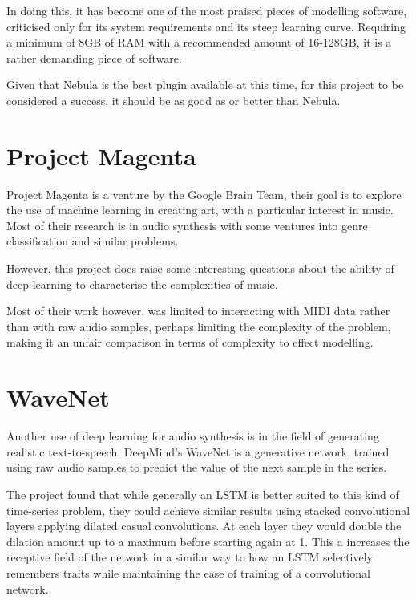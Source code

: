 \documentclass{l4proj}
\begin{document}
In doing this, it has become one of the most praised pieces of modelling
software, criticised only for its system requirements and its steep
learning curve. Requiring a minimum of 8GB of RAM with a recommended
amount of 16-128GB, it is a rather demanding piece of software.

Given that Nebula is the best plugin available at this time, for this
project to be considered a success, it should be as good as or better
than Nebula.

\hypertarget{project-magenta}{%
\section{Project Magenta}\label{project-magenta}}

Project Magenta is a venture by the Google Brain Team, their goal is to
explore the use of machine learning in creating art, with a particular
interest in music. Most of their research is in audio synthesis with
some ventures into genre classification and similar problems.

However, this project does raise some interesting questions about the
ability of deep learning to characterise the complexities of music.

Most of their work however, was limited to interacting with MIDI data
rather than with raw audio samples, perhaps limiting the complexity of
the problem, making it an unfair comparison in terms of complexity to
effect modelling.

\hypertarget{wavenet}{%
\section{WaveNet}\label{wavenet}}

Another use of deep learning for audio synthesis is in the field of
generating realistic text-to-speech. DeepMind's WaveNet is a generative
network, trained using raw audio samples to predict the value of the
next sample in the series.

The project found that while generally an LSTM is better suited to this
kind of time-series problem, they could achieve similar results using
stacked convolutional layers applying dilated casual convolutions. At
each layer they would double the dilation amount up to a maximum before
starting again at 1. This a increases the receptive field of the network
in a similar way to how an LSTM selectively remembers traits while
maintaining the ease of training of a convolutional network.
\end{document}
